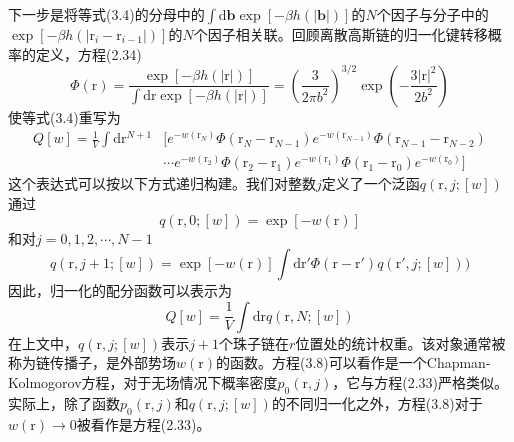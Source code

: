 下一步是将等式(3.4)的分母中的$\int\mathrm{d}\mathbf{b}\exp[-\beta h(\left|\mathbf{b}\right|)]$的$N$个因子与分子中的$\exp[-\beta h(\left|\mathrm{r}_i-\mathrm{r}_{i-1}\right|)]$的$N$个因子相关联。回顾离散高斯链的归一化键转移概率的定义，方程(2.34)
\begin{equation}
\Phi(\mathrm{r})=\frac{\exp[-\beta h(\left|\mathrm{r}\right|)]}{\int\mathrm{d}\mathrm{r}\exp[-\beta h(\left|\mathrm{r}\right|)]}=\left(\frac{3}{2\pi b^2}\right)^{3/2}\exp\left(-\frac{3\left|\mathrm{r}\right|^2}{2b^2}\right)
\end{equation}
使等式(3.4)重写为
\begin{equation}
\begin{aligned}
Q[w]=\frac{1}{V}\int\mathrm{d}\mathrm{r}^{N+1}&[e^{-w(\mathrm{r}_N)}\Phi(\mathrm{r}_N-\mathrm{r}_{N-1})e^{-w(\mathrm{r}_{N-1})}\Phi(\mathrm{r}_{N-1}-\mathrm{r}_{N-2})\\
&\cdots e^{-w(\mathrm{r}_2)}\Phi(\mathrm{r}_2-\mathrm{r}_1)e^{-w(\mathrm{r}_1)}\Phi(\mathrm{r}_1-\mathrm{r}_0)e^{-w(\mathrm{r}_0)}]
\end{aligned}
\end{equation}
这个表达式可以按以下方式递归构建。我们对整数$j$定义了一个泛函$q(\mathrm{r},j;[w])$通过
\begin{equation}
q(\mathrm{r},0;[w])=\exp[-w(\mathrm{r})]
\end{equation}
和对$j=0,1,2,\cdots,N-1$
\begin{equation}
q(\mathrm{r},j+1;[w])=\exp[-w(\mathrm{r})]\int\mathrm{d}\mathrm{r}'\Phi(\mathrm{r}-\mathrm{r}')q(\mathrm{r}',j;[w]))
\end{equation}
因此，归一化的配分函数可以表示为
\begin{equation}
Q[w]=\frac{1}{V}\int\mathrm{d}\mathrm{r}q(\mathrm{r},N;[w])
\end{equation}
在上文中，$q(\mathrm{r},j;[w])$表示$j+1$个珠子链在$r$位置处的统计权重。该对象通常被称为链传播子，是外部势场$w(\mathrm{r})$的函数。方程(3.8)可以看作是一个Chapman-Kolmogorov方程，对于无场情况下概率密度$p_0(\mathrm{r},j)$，它与方程(2.33)严格类似。实际上，除了函数$p_0(\mathrm{r},j)$和$q(\mathrm{r},j;[w])$的不同归一化之外，方程(3.8)对于$w(\mathrm{r})\rightarrow 0$被看作是方程(2.33)。

